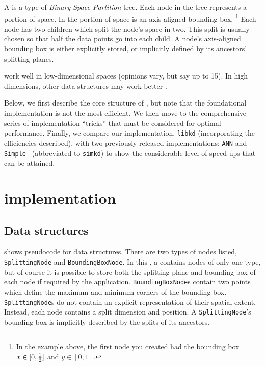 A \kdtree is a type of \emph{Binary Space Partition} tree.  Each node
in the tree represents a portion of space.  In \kdtrees the portion of
space is an axis-aligned bounding box.%
\footnote{In the example above, the first node you created had the
bounding box $x \in [0, \frac{1}{2}]$ and $y \in [0, 1]$.}  Each node has
two children which split the node's space in two.  This split is
usually chosen so that half the data points go into each child.  A
node's axis-aligned bounding box is either explicitly stored, or
implicitly defined by its ancestors' splitting planes.





\Kdtrees work well in low-dimensional spaces (opinions vary, but say up to 15).
In high dimensions, other data structures may work better \cite{bohm2001}.

\def\ignore#1{}
\ignore{}{Below, we first describe the core structure of \kdtrees, but note that the foundational implementation is not the most efficient. We then move to the comprehensive series of implementation ``tricks'' that must be considered for optimal performance. Finally, we compare our implementation, {\tt libkd} (incorporating the efficiencies described), with two previously released \kdtree implementations: {\tt ANN} \cite{arya1998} and {\tt Simple \kdtrees} \cite{simkd} (abbreviated to {\tt simkd}) to show the considerable level of speed-ups that can be attained.}

\section{\Kdtree implementation}

\subsection{Data structures}
\label{sec:datastruct}

 shows pseudocode for \kdtree data
structures.  There are two types of \kdtree nodes listed, {\tt
SplittingNode} and {\tt BoundingBoxNode}.  In this \doctype, a \kdtree
contains nodes of only one type, but of course it is possible to store
both the splitting plane and bounding box of each node if required by
the application.  {\tt BoundingBoxNode}s contain two points which
define the maximum and minimum corners of the bounding box.  {\tt
SplittingNode}s do not contain an explicit representation of their
spatial extent.  Instead, each node contains a split dimension and
position.  A {\tt SplittingNode}'s bounding box is implicitly
described by the splits of its ancestors.


